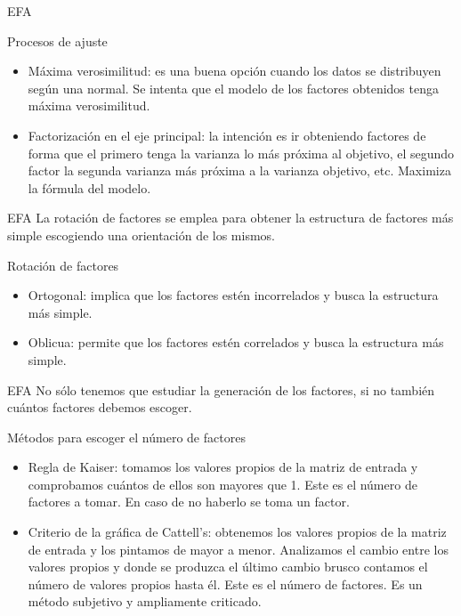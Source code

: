 \documentclass[10pt]{beamer}
\begin{document}
\begin{frame}[fragile]{EFA}
\vspace{10px}
\begin{block}{Procesos de ajuste}
	\begin{itemize}
		\item Máxima verosimilitud: es una buena opción cuando los datos se distribuyen según una normal. Se intenta que el modelo de los factores obtenidos tenga máxima verosimilitud.
		\item Factorización en el eje principal: la intención es ir obteniendo factores de forma que el primero tenga la varianza lo más próxima al objetivo, el segundo factor la segunda varianza más próxima a la varianza objetivo, etc. Maximiza la fórmula del modelo.
	\end{itemize}
\end{block}
\end{frame}

\begin{frame}[fragile]{EFA}
	La rotación de factores se emplea para obtener la estructura de factores más simple escogiendo una orientación de los mismos.
	\vspace{10px}
	\begin{block}{Rotación de factores}
		\begin{itemize}
			\item Ortogonal: implica que los factores estén incorrelados y busca la estructura más simple.
			\item Oblicua: permite que los factores estén correlados y busca la estructura más simple.
		\end{itemize}
	\end{block}
\end{frame}


\begin{frame}[fragile]{EFA}
No sólo tenemos que estudiar la generación de los factores, si no también cuántos factores debemos escoger.
\vspace{10px}
\begin{block}{Métodos para escoger el número de factores}
	\begin{itemize}
		\item Regla de Kaiser: tomamos los valores propios de la matriz de entrada y comprobamos cuántos de ellos son mayores que 1. Este es el número de factores a tomar. En caso de no haberlo se toma un factor.
		\item Criterio de la gráfica de Cattell's: obtenemos los valores propios de la matriz de entrada y los pintamos de mayor a menor. Analizamos el cambio entre los valores propios y donde se produzca el último cambio brusco contamos el número de valores propios hasta él. Este es el número de factores. Es un método subjetivo y ampliamente criticado.
	\end{itemize}
\end{block}
\end{frame}
\end{document}
